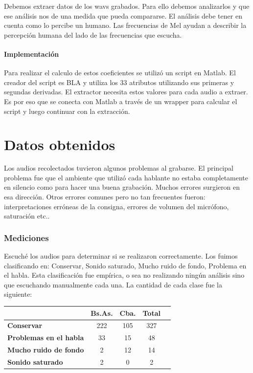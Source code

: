 \documentclass[11pt,a4paper,twoside]{tesis}
\begin{document}
Debemos extraer datos de los wavs grabados. Para ello debemos analizarlos y que ese análisis nos de una medida que pueda compararse. El análisis debe tener en cuenta como lo percibe un humano. Las frecuencias de Mel ayudan a describir la percepción humana del lado de las frecuencias que escucha. 

\subsubsection{Implementación}

Para realizar el calculo de estos coeficientes se utilizó un script en Matlab. El creador del script es BLA y utiliza los 33 atributos utilizando sus primeras y segundas derivadas. El extractor necesita estos valores para cada audio a extraer. Es por eso que se conecta con Matlab a través de un wrapper para calcular el script y luego continuar con la extracción.

\chapter{Datos obtenidos}

Los audios recolectados tuvieron algunos problemas al grabarse. El principal problema fue que el ambiente que utilizó cada hablante no estaba completamente en silencio como para hacer una buena grabación. Muchos errores surgieron en esa dirección. Otros errores comunes pero no tan frecuentes fueron: interpretaciones erróneas de la consigna, errores de volumen del micrófono, saturación etc.. 

\subsection{Mediciones}

Escuché los audios para determinar si se realizaron correctamente. Los fuimos clasificando en: Conservar, Sonido saturado, Mucho ruido de fondo, Problema en el habla. Esta clasificación fue empírica, o sea no realizando ningún análisis sino que escuchando manualmente cada una. La cantidad de cada clase fue la siguiente:

\begin{table}[h]
\centering
\begin{tabular}{|l|c|c|c|c|}
\hline
\textbf{}  & \textbf{Bs.As. } & \textbf{Cba.} & \textbf{Total} \\ \hline
\textbf{Conservar}  & 222 & 105 & 327 \\ \hline
\textbf{Problemas en el habla}  & 33 & 15 & 48 \\ \hline
\textbf{Mucho ruido de fondo}  & 2 & 12 & 14 \\ \hline
\textbf{Sonido saturado}  & 2 & 0 & 2 \\ \hline
\end{tabular}
\end{table}
\end{document}
